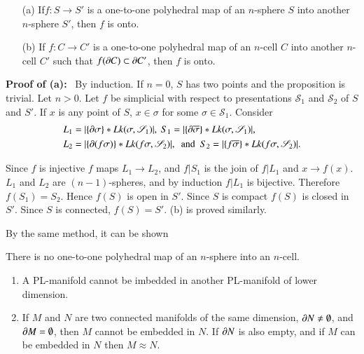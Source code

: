 \begin{proposition}\label{chap4-prop4.4.14}
\begin{itemize}
\item[\rm(a)] If\pageoriginale $f:S\to S'$ is a one-to-one polyhedral map of an $n$-sphere $S$ into another $n$-sphere $S'$, then $f$ is onto.

\item[\rm(b)] If $f:C\to C'$ is a one-to-one polyhedral map of an $n$-cell $C$ into another $n$-cell $C'$ such that $f(\partial C)\subset \partial C'$, then $f$ is onto.
\end{itemize}
\end{proposition}

\noindent
{\bf Proof of (a):}~ By induction. If $n=0$, $S$ has two points and the proposition is trivial. Let $n>0$. Let $f$ be simplicial with respect to presentations $\mathscr{S}_{1}$ and $\mathscr{S}_{2}$ of $S$ and $S'$. If $x$ is any point of $S$, $x\in\sigma$ for some $\sigma\in \mathscr{S}_{1}$. Consider
\begin{align*}
L_{1} &= |\{\p \sigma\}\ast Lk(\sigma,\mathscr{S}_{1})|,\ S_{1}=|\{\p \overline{\sigma}\}\ast Lk(\sigma,\mathscr{S}_{1})|,\\
L_{2} &= |\{\p(f\sigma)\}\ast Lk(f\sigma,\mathscr{S}_{2})|,\ \text{ and }\ S_{2}=|\{f\overline{\sigma}\}\ast Lk(f\sigma,\mathscr{S}_{2})|. 
\end{align*}

Since $f$ is injective $f$ maps $L_{1}\to L_{2}$, and $f|S_{1}$ is the join of $f|L_{1}$ and $x\to f(x)$. $L_{1}$ and $L_{2}$ are $(n-1)$-spheres, and by induction $f|L_{1}$ is bijective. Therefore $f(S_{1})=S_{2}$. Hence $f(S)$ is open in $S'$. Since $S$ is compact $f(S)$ is closed in $S'$. Since $S$ is connected, $f(S)=S'$. (b) is proved similarly.

By the same method, it can be shown

\begin{ex}\label{chap4-ex4.4.15}
There is no one-to-one polyhedral map of an $n$-sphere into an $n$-cell.
\end{ex}

\begin{ex}\label{chap4-ex4.4.16}
\begin{enumerate}
\renewcommand{\labelenumi}{(\theenumi)}
\item A PL-manifold cannot be imbedded in another PL-manifold of lower dimension. 

\item If $M$ and $N$ are two connected manifolds of the same dimension, $\partial N\neq \emptyset$, and $\partial M=\emptyset$, then $M$ cannot be embedded in $N$. If $\partial N$ is also empty, and if $M$ can be embedded in $N$ then $M\approx N$.
\end{enumerate}
\end{ex}

